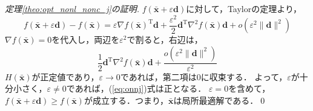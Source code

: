 \documentclass[dvipdfmx]{jsreport}
\begin{document}
\begin{proof}[定理\ref{theo:opt_nonl_nonc_j}の証明]
  $f(\bar{\bm{x}} + \varepsilon \bm{d})$に対して，Taylorの定理より，
  \begin{equation}
    f(\bar{\bm{x}} + \varepsilon \bm{d}) - f(\bar{\bm{x}}) = \varepsilon \nabla f(\bar{\bm{x}})^{\mathrm{T}}\bm{d} + \frac{{\varepsilon}^2}{2} \bm{d}^{\mathrm{T}} {\nabla}^2 f(\bar{\bm{x}}) \bm{d} + o({\varepsilon}^2 \|\bm{d}\|^2) \nonumber
  \end{equation}
  $\nabla f(\bar{\bm{x}}) = 0$を代入し，両辺を${\varepsilon}^2$で割ると，右辺は，
  \begin{equation}\label{eq:onnj}
    \frac{1}{2} \bm{d}^{\mathrm{T}} {\nabla}^2 f(\bar{\bm{x}}) \bm{d} + \frac{o({\varepsilon}^2 \|\bm{d}\|^2)}{{\varepsilon}^2}
  \end{equation}
  $H(\bar{\bm{x}})$が正定値であり，$\varepsilon \rightarrow 0$であれば，第二項は$0$に収束する．
  よって，$\varepsilon$が十分小さく，$\varepsilon \neq 0$であれば，(\ref{eq:onnj})式は正となる．
  $\varepsilon = 0$を含めて，
  $f(\bar{\bm{x}} + \varepsilon \bm{d}) \geq f(\bar{\bm{x}})$が成立する．つまり，$\bar{\bm{x}}$は局所最適解である．\qed
\end{proof}
\end{document}
